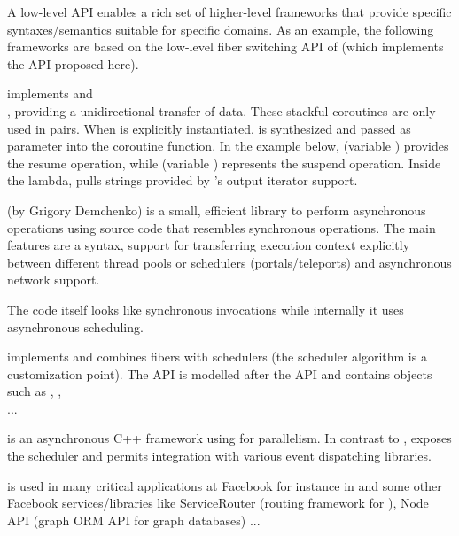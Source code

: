 \label{low_level}

A low-level API enables a rich set of higher-level frameworks that provide
specific syntaxes/semantics suitable for specific domains. As an example, the
following frameworks are based on the low-level fiber switching API of
\bcontext\cite{bcontext} (which implements the API proposed here).

\uabschnitt{\bcoroutine}\cite{bcoroutine2} implements 
 and\\
, providing a
unidirectional transfer of data. These stackful coroutines are only used in
pairs. When  is explicitly
instantiated,  is synthesized and passed as
parameter into the coroutine function. In the
example below,  (variable ) provides the
resume operation, while  (variable )
represents the suspend operation. Inside the lambda,
pulls strings provided by 's output iterator support.

\uabschnitt{\synca}\cite{synca} (by Grigory Demchenko) is a small, efficient
library to perform asynchronous operations using source code that resembles synchronous
operations. The main
features are a  syntax, support for transferring execution context
explicitly between different thread pools or schedulers (portals/teleports) and
asynchronous network support.

The code itself looks like synchronous invocations while internally it uses
asynchronous scheduling.

\uabschnitt{\bfiber}\cite{bfiber} implements  and combines
fibers with schedulers (the scheduler algorithm is a customization point). The API
is modelled after the \thread API and contains objects such as
, ,\\
 ...

\cite{fbfiber} is an asynchronous C++ framework
using  for parallelism. In contrast to \bfiber,
\fbfibers\xspace exposes the scheduler and permits integration with various
event dispatching libraries.

\fbfibers\xspace is used in many critical applications at Facebook for instance
in \fbmcrouter\cite{fbmcrouter} and some other Facebook services/libraries like
ServiceRouter (routing framework for \fbthrift\cite{fbthrift}), Node API (graph
ORM API for graph databases) ...

